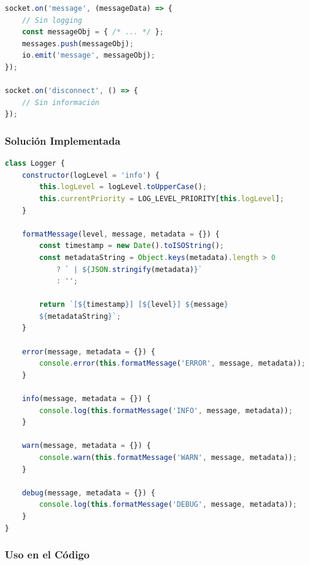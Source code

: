 \documentclass[12pt,a4paper]{article}
\begin{document}
\begin{lstlisting}[caption=Problema Original - Logging Desestructurado, language=JavaScript]
socket.on('message', (messageData) => {
    // Sin logging
    const messageObj = { /* ... */ };
    messages.push(messageObj);
    io.emit('message', messageObj);
});

socket.on('disconnect', () => {
    // Sin información
});
\end{lstlisting}

\subsubsection{Solución Implementada}

\begin{lstlisting}[caption=logger.js - Logger Centralizado, language=JavaScript]
class Logger {
    constructor(logLevel = 'info') {
        this.logLevel = logLevel.toUpperCase();
        this.currentPriority = LOG_LEVEL_PRIORITY[this.logLevel];
    }

    formatMessage(level, message, metadata = {}) {
        const timestamp = new Date().toISOString();
        const metadataString = Object.keys(metadata).length > 0
            ? ` | ${JSON.stringify(metadata)}`
            : '';
        
        return `[${timestamp}] [${level}] ${message}
        ${metadataString}`;
    }

    error(message, metadata = {}) {
        console.error(this.formatMessage('ERROR', message, metadata));
    }

    info(message, metadata = {}) {
        console.log(this.formatMessage('INFO', message, metadata));
    }

    warn(message, metadata = {}) {
        console.warn(this.formatMessage('WARN', message, metadata));
    }

    debug(message, metadata = {}) {
        console.log(this.formatMessage('DEBUG', message, metadata));
    }
}
\end{lstlisting}

\subsubsection{Uso en el Código}
\end{document}
